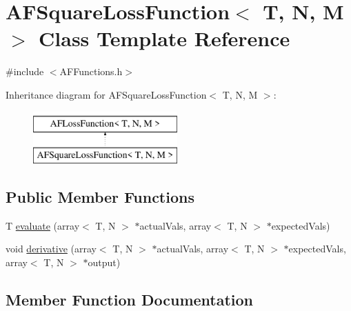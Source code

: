 \hypertarget{class_a_f_square_loss_function}{}\section{A\+F\+Square\+Loss\+Function$<$ T, N, M $>$ Class Template Reference}
\label{class_a_f_square_loss_function}


{\ttfamily \#include $<$A\+F\+Functions.\+h$>$}

Inheritance diagram for A\+F\+Square\+Loss\+Function$<$ T, N, M $>$\+:\begin{figure}[H]
\begin{center}
\leavevmode
\includegraphics[height=2.000000cm]{class_a_f_square_loss_function}
\end{center}
\end{figure}
\subsection*{Public Member Functions}
\begin{DoxyCompactItemize}
\item 
T \hyperlink{class_a_f_square_loss_function_a8556b20b4f32189cbef653d0df5009e1}{evaluate} (array$<$ T, N $>$ $\ast$actual\+Vals, array$<$ T, N $>$ $\ast$expected\+Vals)
\item 
void \hyperlink{class_a_f_square_loss_function_a92d4b54450acad4a0b4ad9fa2a9c1aa7}{derivative} (array$<$ T, N $>$ $\ast$actual\+Vals, array$<$ T, N $>$ $\ast$expected\+Vals, array$<$ T, N $>$ $\ast$output)
\end{DoxyCompactItemize}


\subsection{Member Function Documentation}
\mbox{\label{class_a_f_square_loss_function_a92d4b54450acad4a0b4ad9fa2a9c1aa7}} 
